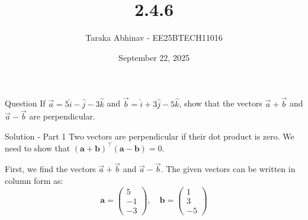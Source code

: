 \documentclass{beamer}
\begin{document}
\title{2.4.6}
\date{September 22, 2025}
\author{Taraka Abhinav - EE25BTECH11016}

\frame{\titlepage}


\begin{frame}{Question}
If $\vec{a} = 5\hat{i} - \hat{j} - 3\hat{k}$ and $\vec{b} = \hat{i} + 3\hat{j} - 5\hat{k}$, show that the vectors $\vec{a} + \vec{b}$ and $\vec{a} - \vec{b}$ are perpendicular.
\end{frame}

\begin{frame}{Solution - Part 1}
Two vectors are perpendicular if their dot product is zero. We need to show that $(\mathbf{a} + \mathbf{b})^\top (\mathbf{a} - \mathbf{b}) = 0$.

First, we find the vectors $\vec{a} + \vec{b}$ and $\vec{a} - \vec{b}$.
The given vectors can be written in column form as:
\begin{equation}
\mathbf{a} = \begin{pmatrix} 5 \\ -1 \\ -3 \end{pmatrix}, \quad \mathbf{b} = \begin{pmatrix} 1 \\ 3 \\ -5 \end{pmatrix}
\end{equation}
\end{frame}
\end{document}
